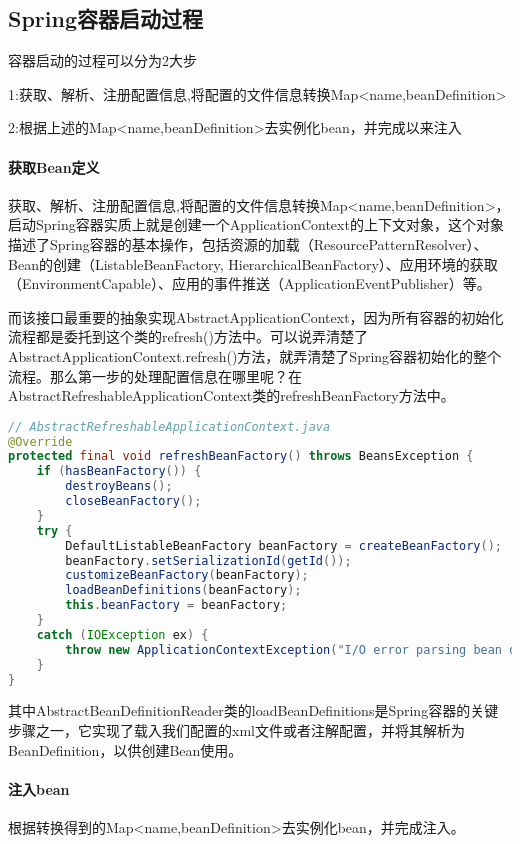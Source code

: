 \documentclass[../../../interview-questions.tex]{subfiles}
\begin{document}
\subsection{Spring容器启动过程}

容器启动的过程可以分为2大步

1:获取、解析、注册配置信息,将配置的文件信息转换Map<name,beanDefinition>

2:根据上述的Map<name,beanDefinition>去实例化bean，并完成以来注入

\paragraph{获取Bean定义}

获取、解析、注册配置信息,将配置的文件信息转换Map<name,beanDefinition>，启动Spring容器实质上就是创建一个ApplicationContext的上下文对象，这个对象描述了Spring容器的基本操作，包括资源的加载（ResourcePatternResolver）、Bean的创建（ListableBeanFactory, HierarchicalBeanFactory）、应用环境的获取（EnvironmentCapable）、应用的事件推送（ApplicationEventPublisher）等。

而该接口最重要的抽象实现AbstractApplicationContext，因为所有容器的初始化流程都是委托到这个类的refresh()方法中。可以说弄清楚了AbstractApplicationContext.refresh()方法，就弄清楚了Spring容器初始化的整个流程。那么第一步的处理配置信息在哪里呢？在AbstractRefreshableApplicationContext类的refreshBeanFactory方法中。

\begin{lstlisting}[language=Java]
// AbstractRefreshableApplicationContext.java
@Override
protected final void refreshBeanFactory() throws BeansException {
    if (hasBeanFactory()) {
        destroyBeans();
        closeBeanFactory();
    }
    try {
        DefaultListableBeanFactory beanFactory = createBeanFactory();
        beanFactory.setSerializationId(getId());
        customizeBeanFactory(beanFactory);
        loadBeanDefinitions(beanFactory);
        this.beanFactory = beanFactory;
    }
    catch (IOException ex) {
        throw new ApplicationContextException("I/O error parsing bean definition source for " + getDisplayName(), ex);
    }
}    
\end{lstlisting}

其中AbstractBeanDefinitionReader类的loadBeanDefinitions是Spring容器的关键步骤之一，它实现了载入我们配置的xml文件或者注解配置，并将其解析为BeanDefinition，以供创建Bean使用。

\paragraph{注入bean}

根据转换得到的Map<name,beanDefinition>去实例化bean，并完成注入。
\end{document}
